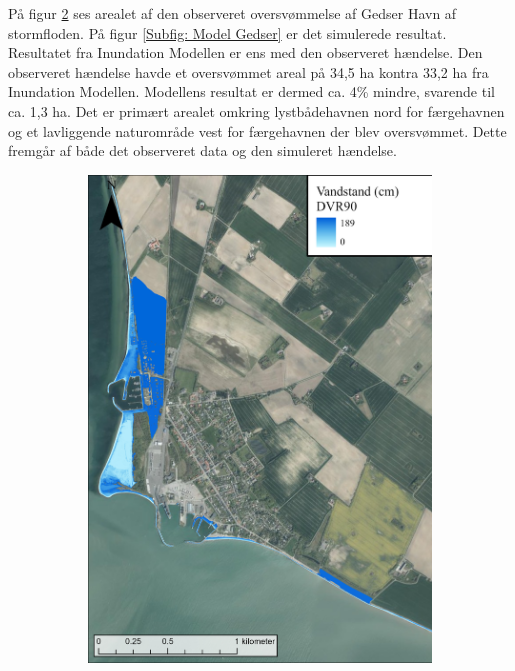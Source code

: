 På figur \ref{Subfig: Målt Gedser} ses arealet af den observeret oversvømmelse af Gedser Havn af stormfloden. På figur \ref{Subfig: Model Gedser} er det simulerede resultat. Resultatet fra Inundation Modellen er ens med den observeret hændelse. Den observeret hændelse havde et oversvømmet areal på 34,5 ha kontra 33,2 ha fra Inundation Modellen. Modellens resultat er dermed ca. 4\% mindre, svarende til ca. 1,3 ha. Det er primært arealet omkring lystbådehavnen nord for færgehavnen og et lavliggende naturområde vest for færgehavnen der blev oversvømmet. Dette fremgår af både det observeret data og den simuleret hændelse.   
\begin{figure}[H]
    \begin{subfigure}[t]{0.5\textwidth}
        \centering
        \includegraphics[width=0.95\linewidth]{images/Resultater/2023Malt/2023 resultat_gedser.jpg}
        \caption{}
        \label{Subfig: Målt Gedser}
    \end{subfigure}

\end{figure}

